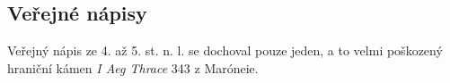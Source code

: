 
\subsection[veřejné-nápisy-18]{Veřejné nápisy}

Veřejný nápis ze 4. až 5. st. n. l. se dochoval pouze jeden, a to velmi poškozený hraniční kámen {\em I Aeg Thrace} 343 z Maróneie.

